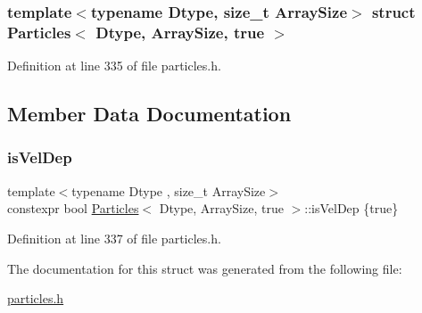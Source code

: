 \subsubsection*{template$<$typename Dtype, size\+\_\+t Array\+Size$>$\newline
struct Particles$<$ Dtype, Array\+Size, true $>$}



Definition at line 335 of file particles.\+h.



\subsection{Member Data Documentation}
\mbox{\label{struct_particles_3_01_dtype_00_01_array_size_00_01true_01_4_ac9666d6f9fffae715f8cce7afbf5e3e5}} 
\subsubsection{\texorpdfstring{is\+Vel\+Dep}{isVelDep}}
{\footnotesize\ttfamily template$<$typename Dtype , size\+\_\+t Array\+Size$>$ \\
constexpr bool \mbox{\hyperlink{struct_particles}{Particles}}$<$ Dtype, Array\+Size, true $>$\+::is\+Vel\+Dep \{true\}\hspace{0.3cm}{\ttfamily [static]}}



Definition at line 337 of file particles.\+h.



The documentation for this struct was generated from the following file\+:\begin{DoxyCompactItemize}
\item 
\mbox{\hyperlink{particles_8h}{particles.\+h}}\end{DoxyCompactItemize}

